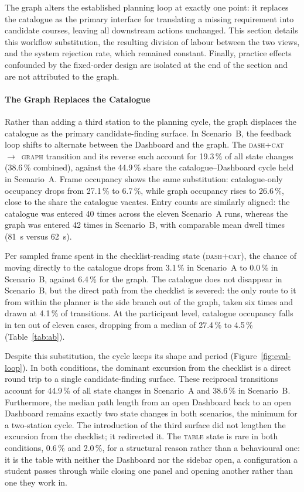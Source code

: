 The graph alters the established planning loop at exactly one point: it replaces the catalogue as the primary interface for translating a missing requirement into candidate courses, leaving all downstream actions unchanged. This section details this workflow substitution, the resulting division of labour between the two views, and the system rejection rate, which remained constant. Finally, practice effects confounded by the fixed-order design are isolated at the end of the section and are not attributed to the graph.

\paragraph{The Graph Replaces the Catalogue}
\label{sec:eval-substitution}
Rather than adding a third station to the planning cycle, the graph displaces the catalogue as the primary candidate-finding surface. In Scenario~B, the feedback loop shifts to alternate between the Dashboard and the graph. The \textsc{dash+cat}~$\rightarrow$~\textsc{graph} transition and its reverse each account for 19.3\,\% of all state changes (38.6\,\% combined), against the 44.9\,\% share the catalogue--Dashboard cycle held in Scenario~A. Frame occupancy shows the same substitution: catalogue-only occupancy drops from 27.1\,\% to 6.7\,\%, while graph occupancy rises to 26.6\,\%, close to the share the catalogue vacates. Entry counts are similarly aligned: the catalogue was entered 40 times across the eleven Scenario~A runs, whereas the graph was entered 42 times in Scenario~B, with comparable mean dwell times (81~s versus 62~s).

Per sampled frame spent in the checklist-reading state (\textsc{dash+cat}), the chance of moving directly to the catalogue drops from 3.1\,\% in Scenario~A to 0.0\,\% in Scenario~B, against 6.4\,\% for the graph. The catalogue does not disappear in Scenario~B, but the direct path from the checklist is severed: the only route to it from within the planner is the side branch out of the graph, taken six times and drawn at 4.1\,\% of transitions. At the participant level, catalogue occupancy falls in ten out of eleven cases, dropping from a median of 27.4\,\% to 4.5\,\% (Table~\ref{tab:ab}).

Despite this substitution, the cycle keeps its shape and period (Figure~\ref{fig:eval-loop}). In both conditions, the dominant excursion from the checklist is a direct round trip to a single candidate-finding surface. These reciprocal transitions account for 44.9\,\% of all state changes in Scenario~A and 38.6\,\% in Scenario~B. Furthermore, the median path length from an open Dashboard back to an open Dashboard remains exactly two state changes in both scenarios, the minimum for a two-station cycle. The introduction of the third surface did not lengthen the excursion from the checklist; it redirected it. The \textsc{table} state is rare in both conditions, 0.6\,\% and 2.0\,\%, for a structural reason rather than a behavioural one: it is the table with neither the Dashboard nor the sidebar open, a configuration a student passes through while closing one panel and opening another rather than one they work in.

